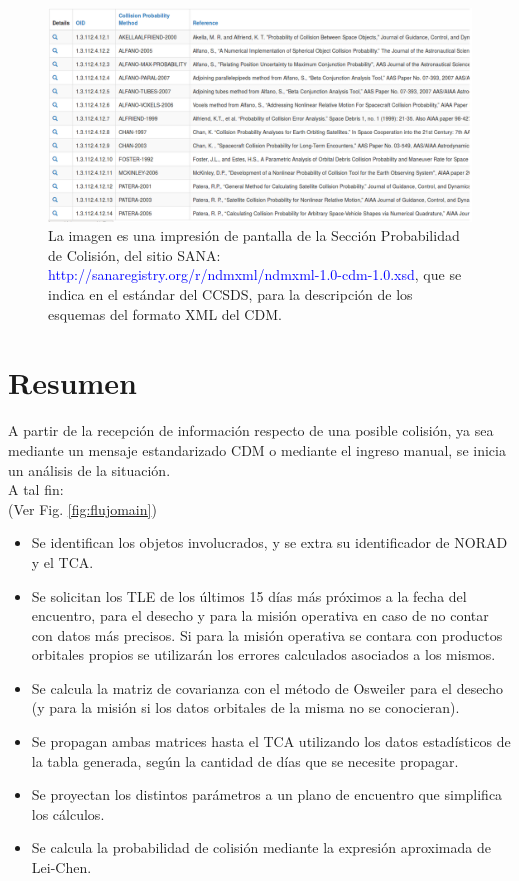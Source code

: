 {\begin{figure}[!h]
\centering
\includegraphics[width=\textwidth]{imagenes/sanaPoCmetodos}
\caption[M\'etodos de c\'alculo de PoC - (Sitio Web SANA)]{ La imagen es una impresi\'on de pantalla de la Secci\'on Probabilidad de Colisi\'on, del sitio SANA: \textcolor{blue}{http://sanaregistry.org/r/ndmxml/ndmxml-1.0-cdm-1.0.xsd}, que se indica en el est\'andar del CCSDS, para la descripci\'on de los esquemas del formato XML del CDM.}
\label{fig:pagsana}
\end{figure}

\section*{Resumen}
A partir de la recepci\'on de informaci\'on respecto de una posible colisi\'on, ya sea mediante un mensaje estandarizado CDM o mediante el ingreso manual, se inicia un an\'alisis de la situaci\'on.\\
A tal fin:\\
(Ver Fig. \ref{fig:flujomain})
\begin{itemize}
\itemsep0em
\item Se identifican los objetos involucrados, y se extra su identificador de NORAD y el TCA.
\item Se solicitan los TLE de los \'ultimos 15 d\'ias m\'as pr\'oximos a la fecha del encuentro, para el desecho y para la misi\'on operativa en caso de no contar con datos m\'as precisos. Si para la misi\'on operativa se contara con productos orbitales propios se utilizar\'an los errores calculados asociados a los mismos.
\item Se calcula la matriz de covarianza con el m\'etodo de Osweiler para el desecho (y para la misi\'on si los datos orbitales de la misma no se conocieran).
\item Se propagan ambas matrices hasta el TCA utilizando los datos estad\'isticos de la tabla generada, seg\'un la cantidad de d\'ias que se necesite propagar.
\item Se proyectan los distintos par\'ametros a un plano de encuentro que simplifica los c\'alculos.
\item Se calcula la probabilidad de colisi\'on mediante la expresi\'on aproximada de Lei-Chen.
\end{itemize}

}
